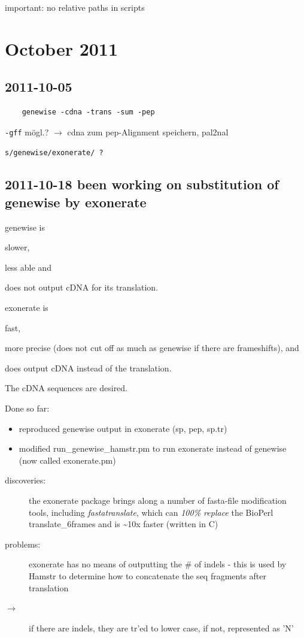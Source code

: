 important: no relative paths in scripts

\section{October 2011}
\subsection*{2011-10-05}
\begin{verbatim}
	genewise -cdna -trans -sum -pep
\end{verbatim}
\verb|-gff| mögl.? $\rightarrow$ cdna zum pep-Alignment speichern, pal2nal

\verb|s/genewise/exonerate/ ?|

\subsection*{2011-10-18 been working on substitution of genewise by exonerate}
genewise is 
\begin{inparaenum}
	\item slower, 
	\item less able and 
	\item does not output cDNA for its translation.
\end{inparaenum}

exonerate is
\begin{inparaenum}
	\item fast,
	\item more precise (does not cut off as much as genewise if there are
	frameshifts), and 
	\item does output cDNA instead of the translation.
\end{inparaenum}

The cDNA sequences are desired.

Done so far:
\begin{itemize}
	\item reproduced genewise output in exonerate (sp, pep, sp.tr)
	\item modified run\_genewise\_hamstr.pm to run exonerate instead of genewise
	(now called exonerate.pm)
\end{itemize}

\begin{description}
\item[discoveries:] the exonerate package brings along a number of fasta-file
modification tools, including \emph{fastatranslate}, which can \emph{100\%
replace} the BioPerl translate\_6frames and is \textasciitilde 10x faster
(written in C)
\item[problems:] exonerate has no means of outputting the \# of indels - this is
used by Hamstr to determine how to concatenate the seq fragments after
translation
\item[$\rightarrow$] if there are indels, they are tr'ed to lower case, if not,
represented as 'N'
\end{description}

